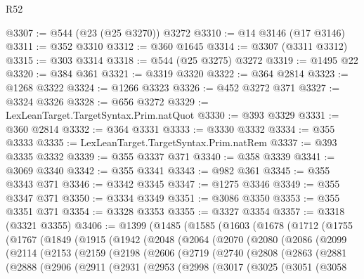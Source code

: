 \begin{lexlean}{R52}
\begin{coremodule}
@3307 := @544 (@23 (@25 @3270)) @3272
@3310 := @14 @3146 (@17 @3146)
@3311 := @352 @3310
@3312 := @360 @1645
@3314 := @3307 (@3311 @3312)
@3315 := @303 @3314
@3318 := @544 (@25 @3275) @3272
@3319 := @1495 @22
@3320 := @384 @361
@3321 := @3319 @3320
@3322 := @364 @2814
@3323 := @1268 @3322
@3324 := @1266 @3323
@3326 := @452 @3272 @371
@3327 := @3324 @3326
@3328 := @656 @3272
@3329 := LexLeanTarget.TargetSyntax.Prim.natQuot
@3330 := @393 @3329
@3331 := @360 @2814
@3332 := @364 @3331
@3333 := @3330 @3332
@3334 := @355 @3333
@3335 := LexLeanTarget.TargetSyntax.Prim.natRem
@3337 := @393 @3335 @3332
@3339 := @355 @3337 @371
@3340 := @358 @3339
@3341 := @3069 @3340
@3342 := @355 @3341
@3343 := @982 @361
@3345 := @355 @3343 @371
@3346 := @3342 @3345
@3347 := @1275 @3346
@3349 := @355 @3347 @371
@3350 := @3334 @3349
@3351 := @3086 @3350
@3353 := @355 @3351 @371
@3354 := @3328 @3353
@3355 := @3327 @3354
@3357 := @3318 (@3321 @3355)
@3406 := @1399
    (@1485
      (@1585
        (@1603
          (@1678
            (@1712
              (@1755
                (@1767
                  (@1849
                    (@1915
                      (@1942
                        (@2048
                          (@2064
                            (@2070
                              (@2080
                                (@2086
                                  (@2099
                                    (@2114
                                      (@2153
                                        (@2159
                                          (@2198
                                            (@2606
                                              (@2719
                                                (@2740
                                                  (@2808
                                                    (@2863
                                                      (@2881
                                                        (@2888
                                                          (@2906
                                                            (@2911
                                                              (@2931
                                                                (@2953
                                                                  (@2998
                                                                    (@3017
                                                                      (@3025
                                                                        (@3051
                                                                          (@3058

\end{coremodule}
\end{lexlean}
